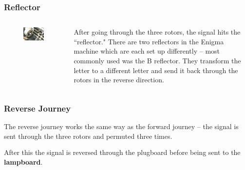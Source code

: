 \documentclass{beamer}
\newcommand{\<}{\langle}
\renewcommand{\>}{\rangle}
\begin{document}
\begin{frame}
\frametitle{Reflector}
\begin{columns}
\begin{column}{.5\textwidth}
\begin{figure}
\includegraphics[scale=.25]{IMG/reflector}

\end{figure}
\end{column}
\begin{column}{.5\textwidth}
After going through the three rotors, the signal hits the ``reflector." There are two reflectors in the Enigma machine which are each set up differently -- most commonly used was the B reflector. They transform the letter to a different letter and send it back through the rotors in the reverse direction. 
\end{column}
\end{columns}
\end{frame}


\begin{frame}
\frametitle{Reverse Journey}

The reverse journey works the same way as the forward journey -- the signal is sent through the three rotors and permuted three times. \newline

After this the signal is reversed through the plugboard before being sent to the \textbf{lampboard}.
\end{frame}
\end{document}
